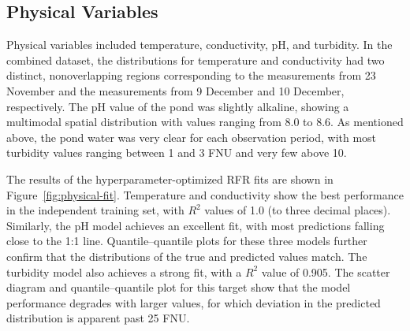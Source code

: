 \documentclass[remotesensing,article,accept,pdftex,moreauthors]{Definitions/mdpi}
\begin{document}
\subsection{Physical Variables}

Physical variables included temperature, conductivity, pH, and turbidity. In the combined dataset, the distributions for temperature and conductivity had two distinct, nonoverlapping regions corresponding to the measurements from 23 November and the measurements from 9 December and 10 December, respectively. The pH value of the pond was slightly alkaline, showing a multimodal spatial distribution with values ranging from 8.0 to 8.6. As mentioned above, the pond water was very clear for each observation period, with most turbidity values ranging between 1 and 3 FNU and very few above 10.

The results of the hyperparameter-optimized RFR fits are shown in Figure~\ref{fig:physical-fit}. Temperature and conductivity show the best performance in the independent training set, with $R^2$ values of 1.0 (to three decimal places). Similarly, the pH model achieves an excellent fit, with most predictions falling close to the 1:1 line. Quantile--quantile plots for these three models further confirm that the distributions of the true and predicted values match. The turbidity model also achieves a strong fit, with a $R^2$ value of 0.905. The scatter diagram and quantile--quantile plot for this target show that the model performance degrades with larger values, for which deviation in the predicted distribution is apparent past 25 FNU.
\end{document}

